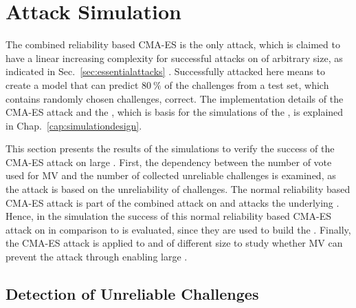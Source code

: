 \chapter{Attack Simulation}
\label{cap:attacksimulations}

The combined reliability based \ac{CMA-ES} is the only attack, which is claimed to have a linear increasing complexity for successful attacks on \xpufs of arbitrary size, as indicated in Sec.\ \ref{sec:essentialattacks} \cite{Becker2015ThePUFs}.
Successfully attacked here means to create a model that can predict $80\ \%$ of the challenges from a test set, which contains randomly chosen challenges, correct.
The implementation details of the \ac{CMA-ES} attack and the \apuf, which is basis for the simulations of the \mpuf, is explained in Chap.\ \ref{cap:simulationdesign}.

This section presents the results of the simulations to verify the success of the \ac{CMA-ES} attack on large \xpufs.
First, the dependency between the number of vote used for \ac{MV} and the number of collected unreliable challenges is examined, as the attack is based on the unreliability of challenges.
The normal reliability based \ac{CMA-ES} attack is part of the combined attack on \mxpufs and attacks the underlying \mpufs.
Hence, in the simulation the success of this normal reliability based \ac{CMA-ES} attack on \mpufs in comparison to \apufs is evaluated, since they are used to build the \mxpuf.
Finally, the \ac{CMA-ES} attack is applied to \xpufs and \mxpufs of different size to study whether \ac{MV} can prevent the attack through enabling large \mxpufs. 


\section{Detection of Unreliable Challenges}
\label{sec:detectionofunreliablechallenges}

